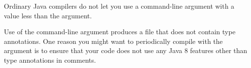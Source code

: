 Ordinary Java compilers do not let you use a  command-line
argument with a value less than the  argument.

Use of the  command-line argument produces a 
file that does not contain type annotations.  One reason you might want to
periodically compile with the  argument is to ensure that
your code does not use any Java 8 features other than type annotations in
comments.


